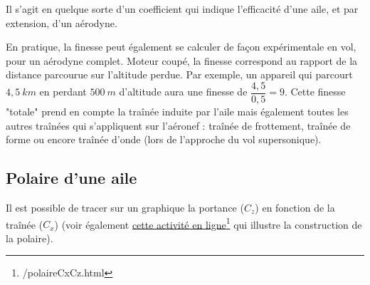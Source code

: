 Il s'agit en quelque sorte d'un coefficient qui indique l'efficacité d'une aile, et par extension, d'un aérodyne.

En pratique, la finesse peut également se calculer de façon expérimentale en vol, pour un aérodyne complet. Moteur coupé, la finesse  correspond au rapport de la distance parcourue sur l'altitude perdue. Par exemple, un appareil qui parcourt $4,5~km$ en perdant $500~m$ d'altitude aura une finesse de $\dfrac{4,5}{0,5} = 9$. Cette finesse "totale" prend en compte la traînée induite par l'aile mais également toutes les autres traînées qui s'appliquent sur l'aéronef : traînée de frottement, traînée de forme ou encore traînée d'onde (lors de l'approche du vol supersonique).

	

\subsection{Polaire d'une aile}
Il est possible de tracer sur un graphique la portance ($C_z$) en fonction de la traînée ($C_x$) (voir également \href{\urlSite /polaireCxCz.html}{cette activité en ligne}\footnote{\urlSite /polaireCxCz.html} qui illustre la construction de la polaire).

